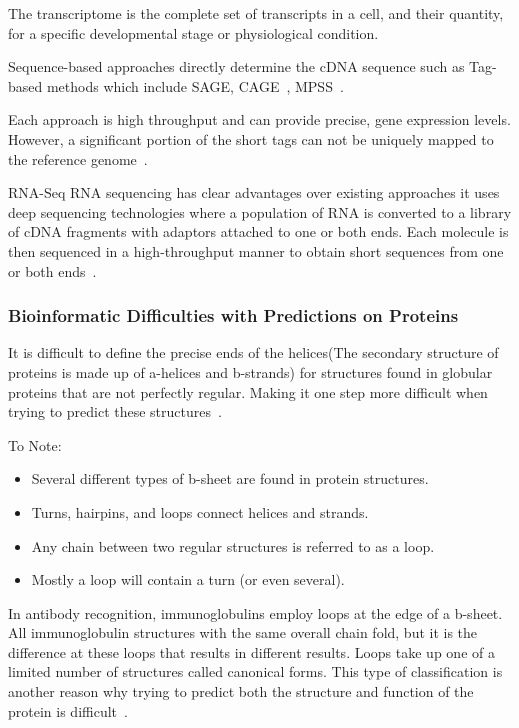 \documentclass[]{final_report}
\begin{document}
\begin{definition}[transcriptome]
    The transcriptome is the complete set of transcripts in a cell, and their quantity, for a specific developmental stage or physiological condition. 
\end{definition}

Sequence-based approaches directly determine the cDNA sequence such as Tag-based methods which include SAGE, CAGE~\cite{kodzius_cage_2006}, MPSS~\cite{reinartz_massively_2002}.

Each approach is high throughput and can provide precise, gene expression levels. However, a significant portion of the short tags can not be uniquely mapped to the reference genome~\cite{wang_rna-seq_2009}.

RNA-Seq RNA sequencing has clear advantages over existing approaches it uses deep sequencing technologies where a population of RNA is converted to a library of cDNA fragments with adaptors attached to one or both ends. Each molecule is then sequenced in a high-throughput manner to obtain short sequences from one or both ends~\cite{wang_rna-seq_2009}.

\clearpage

\subsubsection{Bioinformatic Difficulties with Predictions on Proteins}

It is difficult to define the precise ends of the helices(The secondary structure of proteins is made up of a-helices and b-strands) for structures found in globular proteins that are not perfectly regular. Making it one step more difficult when trying to predict these structures~\cite{zvelebil_understanding_2008}.

To Note:
\begin{itemize}
    \item Several different types of b-sheet are found in protein structures.
    \item Turns, hairpins, and loops connect helices and strands. 
    \item Any chain between two regular structures is referred to as a loop.
    \item Mostly a loop will contain a turn (or even several).
\end{itemize} 

In antibody recognition, immunoglobulins employ loops at the edge of a b-sheet. All immunoglobulin structures with the same overall chain fold, but it is the difference at these loops that results in different results. Loops take up one of a limited number of structures called canonical forms. This type of classification is another reason why trying to predict both the structure and function of the protein is difficult~\cite{zvelebil_understanding_2008}.
\end{document}
